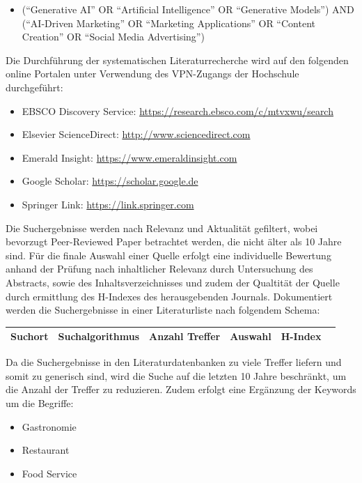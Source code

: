 \begin{itemize}
    \item (``Generative AI'' OR ``Artificial Intelligence'' OR ``Generative Models'') AND (``AI-Driven Marketing'' OR ``Marketing Applications'' OR ``Content Creation'' OR ``Social Media Advertising'')
\end{itemize}

Die Durchführung der systematischen Literaturrecherche wird auf den folgenden online Portalen unter Verwendung des VPN-Zugangs der Hochschule durchgeführt:

\begin{itemize}
    \item EBSCO Discovery Service: \url{https://research.ebsco.com/c/mtvxwu/search}
    \item Elsevier ScienceDirect: \url{http://www.sciencedirect.com}
    \item Emerald Insight: \url{https://www.emeraldinsight.com}
    \item Google Scholar: \url{https://scholar.google.de}
    \item Springer Link: \url{https://link.springer.com}
\end{itemize}

Die Suchergebnisse werden nach Relevanz und Aktualität gefiltert, wobei bevorzugt Peer-Reviewed Paper betrachtet werden, die nicht älter als 10 Jahre sind.
Für die finale Auswahl einer Quelle erfolgt eine individuelle Bewertung anhand der Prüfung nach inhaltlicher Relevanz durch Untersuchung des Abstracts, sowie des Inhaltsverzeichnisses und zudem der Qualtität der Quelle durch ermittlung des H-Indexes des herausgebenden Journals.
Dokumentiert werden die Suchergebnisse in einer Literaturliste nach folgendem Schema:

\begin{tabular}{|l|l|l|l|l|l|}
\hline
Suchort & Suchalgorithmus & Anzahl Treffer & Auswahl & H-Index \\ \hline
\end{tabular}

Da die Suchergebnisse in den Literaturdatenbanken zu viele Treffer liefern und somit zu generisch sind, wird die Suche auf die letzten 10 Jahre beschränkt, um die Anzahl der Treffer zu reduzieren.
Zudem erfolgt eine Ergänzung der Keywords um die Begriffe:

\begin{itemize}
    \item Gastronomie
    \item Restaurant
    \item Food Service
\end{itemize}

